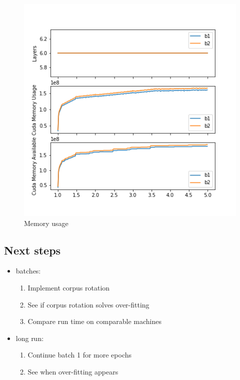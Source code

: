 \begin{figure}[h]
\centering
\includegraphics{parts/appendix/reports-gmsnn/docs_esteban-latex/test_reports/2018-06-13/batch_1_2_memory.png}
\caption{Memory usage}
\end{figure}

\subsection{Next steps}

\begin{itemize}
\item
  batches:

  \begin{enumerate}
  \def\labelenumi{\arabic{enumi}.}
  \item
    Implement corpus rotation
  \item
    See if corpus rotation solves over-fitting
  \item
    Compare run time on comparable machines
  \end{enumerate}
\item
  long run:

  \begin{enumerate}
  \def\labelenumi{\arabic{enumi}.}
  \item
    Continue batch 1 for more epochs
  \item
    See when over-fitting appears
  \end{enumerate}
\end{itemize}
